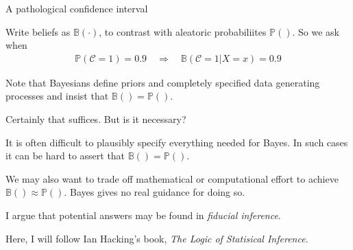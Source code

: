 \documentclass[8pt]{beamer}\usepackage[]{graphicx}\usepackage[]{color}
\def\p#1{\mathbb{P}\left(#1\right)}
\def\b#1{\mathbb{B}\left(#1\right)}
\def\cover{\mathscr{C}}
\begin{document}
\begin{frame}{A pathological confidence interval}

Write beliefs as $\b{\cdot}$, to contrast with aleatoric
probabiliites $\p{}$. So we ask when
%
\begin{align*}
%
\p{\cover = 1} = 0.9 \quad \Rightarrow \quad
\b{\cover = 1 | X = x} = 0.9
%
\end{align*}

\pause

\hrulefill

Note that Bayesians define priors and completely specified
data generating processes and insist that $\b{} = \p{}$.

Certainly that suffices.  But is it necessary?

\pause

It is often difficult to plausibly specify
everything needed for Bayes.  In such cases it can be hard to
assert that $\b{} = \p{}$.

\pause

We may also want to trade off mathematical or computational effort to achieve
$\b{} \approx \p{}$.  Bayes gives no real guidance for doing so.

\pause

I argue that potential answers may be found in {\em fiducial inference}.

Here, I will follow Ian Hacking's book, {\em The Logic of
Statisical Inference}.

\end{frame}


\end{document}
